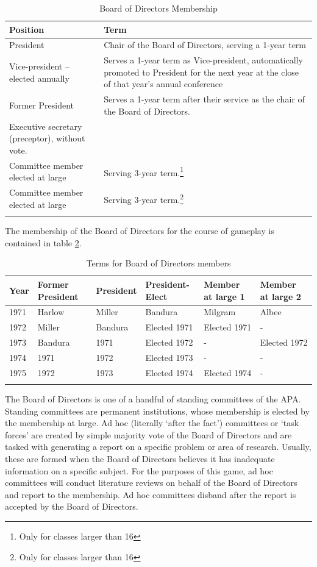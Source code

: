  \begin{longtable}[!t]{ | p{3cm} | p{10cm} | }
\hline
\textbf{Position}&\textbf{Term} \\ \hline
President&Chair of the Board of Directors, serving a 1-year term \\
Vice-president – elected annually&Serves a 1-year term as Vice-president, automatically promoted to President for the next year at the close of that year's annual conference \\
Former President&Serves a 1-year term after their service as the chair of the Board of Directors. \\
Executive secretary (preceptor), without vote.& \\

Committee member elected at large&Serving 3-year term.\footnote{Only for classes larger than 16} \\
Committee member elected at large&Serving 3-year term.\footnote{Only for classes larger than 16} \\ \hline
\caption{Board of Directors Membership}
\label{table: boardMembership}
\end{longtable}

The membership of the Board of Directors for the course of gameplay is contained in table \ref{table: boardMembership}.

 \begin{longtable}[!t]{ | p{1cm} | p{2.5cm} | p{2.5cm} | p{2.5cm} | p{2.5cm} | p{2.5cm} | }
\hline
\textbf{Year}&\textbf{Former President}&\textbf{President}&\textbf{President-Elect}&\textbf{Member at large 1}&\textbf{Member at large 2} \\ \hline
1971&Harlow&Miller&Bandura&Milgram&Albee\\
1972&Miller&Bandura&Elected 1971&Elected 1971&-\\
1973&Bandura&1971&Elected 1972&-&Elected 1972\\
1974&1971&1972&Elected 1973&-&-\\
1975&1972&1973&Elected 1974&Elected 1974&-\\ \hline
\caption{Terms for Board of Directors members}
\label{table: boardMembership}
\end{longtable}

The Board of Directors is one of a handful of standing committees of the APA. Standing committees are permanent institutions, whose membership is elected by the membership at large. Ad hoc (literally `after the fact') committees or `task forces' are created by simple majority vote of the Board of Directors and are tasked with generating a report on a specific problem or area of research. Usually, these are formed when the Board of Directors believes it has inadequate information on a specific subject. For the purposes of this game, ad hoc committees will conduct literature reviews on behalf of the Board of Directors and report to the membership. Ad hoc committees disband after the report is accepted by the Board of Directors. 

